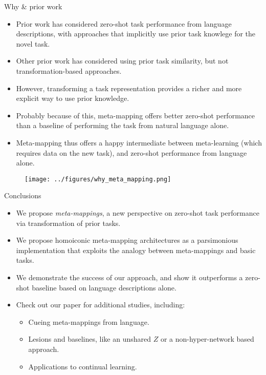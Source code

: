 \documentclass[final]{beamer}
\begin{document}
\begin{frame}[t]{}
\begin{columns}
\begin{column}[t]{0.248\textwidth}
\begin{block}{\huge Why \& prior work}
\vspace{-0.6em}
\begin{itemize}
\item Prior work has considered zero-shot task performance from language descriptions, with approaches that implicitly use prior task knowlege for the novel task.
\item Other prior work has considered using prior task similarity, but not transformation-based approaches.
\item However, transforming a task representation provides a richer and more explicit way to use prior knowledge.
\item Probably because of this, meta-mapping offers better zero-shot performance than a baseline of performing the task from natural language alone.
\item Meta-mapping thus offers a happy intermediate between meta-learning (which requires data on the new task), and zero-shot performance from language alone.
\end{itemize}
\begin{figure}[H]
\centering
\texttt{[image: ../figures/why\_meta\_mapping.png]}
\label{fig_why_meta_mapping}
\end{figure}

\end{block}
\begin{block}{\huge Conclusions}
\vspace{-0.6em}
\begin{itemize}
\item We propose \emph{meta-mappings}, a new perspective on zero-shot task performance via transformation of prior tasks. 
\item We propose homoiconic meta-mapping architectures as a parsimonious implementation that exploits the analogy between meta-mappings and basic tasks. 
\item We demonstrate the success of our approach, and show it outperforms a zero-shot baseline based on language descriptions alone. 
\item Check out our paper for additional studies, including:
    \begin{itemize}
    \Large
    \item Cueing meta-mappings from language.
    \item Lesions and baselines, like an unshared \(Z\) or a non-hyper-network based approach. 
    \item Applications to continual learning.
    \end{itemize}
\end{itemize}
\end{block}
\end{column}
\end{columns}
\end{frame}
\end{document}
